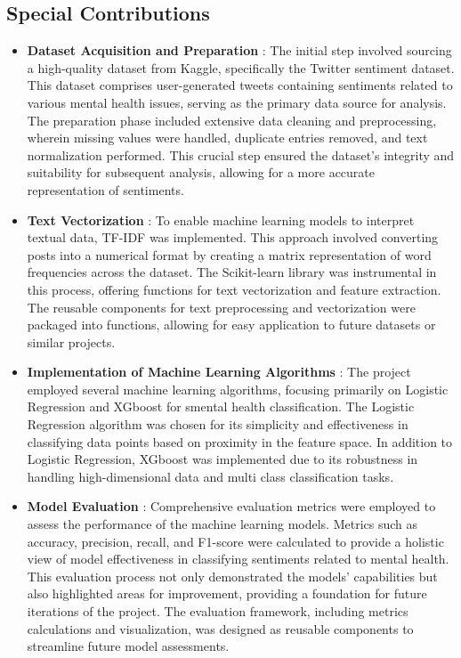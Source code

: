 \subsection{Special Contributions}
\begin{itemize}
    \item \textbf{Dataset Acquisition and Preparation} :
    \noindent
    The initial step involved sourcing a high-quality dataset from Kaggle, specifically the Twitter sentiment dataset. This dataset comprises user-generated tweets containing sentiments related to various mental health issues, serving as the primary data source for analysis. The preparation phase included extensive data cleaning and preprocessing, wherein missing values were handled, duplicate entries removed, and text normalization performed. This crucial step ensured the dataset's integrity and suitability for subsequent analysis, allowing for a more accurate representation of sentiments.
    \item \textbf{Text Vectorization} :
    \noindent
    To enable machine learning models to interpret textual data, TF-IDF was implemented. This approach involved converting posts into a numerical format by creating a matrix representation of word frequencies across the dataset. The Scikit-learn library was instrumental in this process, offering functions for text vectorization and feature extraction. The reusable components for text preprocessing and vectorization were packaged into functions, allowing for easy application to future datasets or similar projects.
    \item \textbf{Implementation of Machine Learning Algorithms} :
    \noindent
    The project employed several machine learning algorithms, focusing primarily on Logistic Regression and XGboost for smental health classification. The Logistic Regression algorithm was chosen for its simplicity and effectiveness in classifying data points based on proximity in the feature space. In addition to Logistic Regression, XGboost was implemented due to its robustness in handling high-dimensional data and multi class classification tasks. 
    \item \textbf{Model Evaluation} :
    \noindent
    Comprehensive evaluation metrics were employed to assess the performance of the machine learning models. Metrics such as accuracy, precision, recall, and F1-score were calculated to provide a holistic view of model effectiveness in classifying sentiments related to mental health. This evaluation process not only demonstrated the models' capabilities but also highlighted areas for improvement, providing a foundation for future iterations of the project. The evaluation framework, including metrics calculations and visualization, was designed as reusable components to streamline future model assessments.

\end{itemize}
